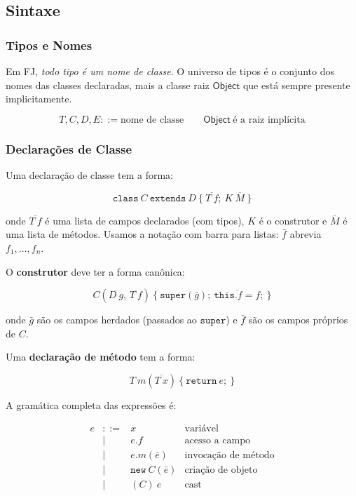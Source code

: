 \subsection{Sintaxe}

\subsubsection{Tipos e Nomes}

Em FJ, \emph{todo tipo é um nome de classe}. O universo de tipos é o
conjunto dos nomes das classes declaradas, mais a classe raiz
\(\mathsf{Object}\) que está sempre presente implicitamente.

\[ T, C, D, E ::= \text{nome de classe} \qquad \mathsf{Object}\ \text{é a raiz
implícita} \]

\subsubsection{Declarações de Classe}

Uma declaração de classe tem a forma:

\[ \mathtt{class}\ C\ \mathtt{extends}\ D\ \{\ \overline{T\ f};\ K\
\overline{M}\ \} \]

onde \(\overline{T\ f}\) é uma lista de campos declarados (com
tipos), \(K\) é o construtor e \(\overline{M}\) é uma lista de
métodos. Usamos a notação com barra para listas: \(\bar{f}\) abrevia
\(f_1, \ldots, f_n\).

O \textbf{construtor} deve ter a forma canônica:

\[ C(\overline{D\ g},\, \overline{T\ f})\ \{\ \mathtt{super}(\bar{g});\
\overline{\mathtt{this}.f = f};\ \} \]

onde \(\bar{g}\) são os campos herdados (passados ao
\(\mathtt{super}\)) e \(\bar{f}\) são os campos próprios de \(C\).

Uma \textbf{declaração de método} tem a forma:

\[ T\ m(\overline{T\ x})\ \{\ \mathtt{return}\ e;\ \} \]

A gramática completa das expressões é:

\[
  \begin{array}{rcll}
    e & ::= & x              & \text{variável} \\
      & |   & e.f            & \text{acesso a campo} \\
      & |   & e.m(\bar{e})   & \text{invocação de método} \\
      & |   & \mathtt{new}\ C(\bar{e}) & \text{criação de objeto} \\
      & |   & (C)\ e         & \text{cast}
  \end{array}
\]

